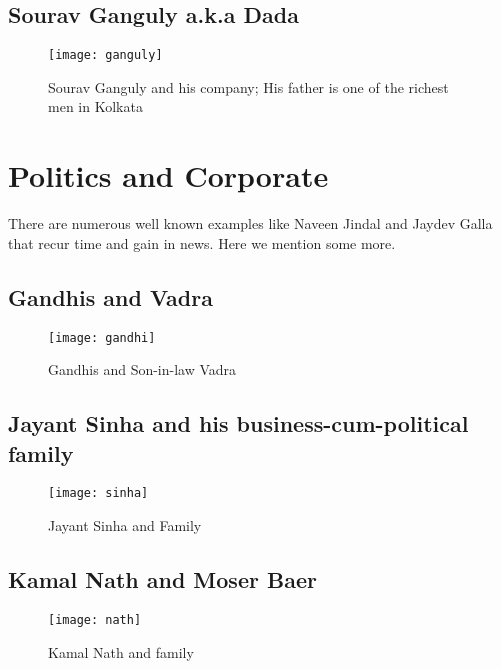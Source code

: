 \subsection{Sourav Ganguly a.k.a Dada}

\begin{figure}[H]
\begin{center}  
\texttt{[image: ganguly]} 
\caption{Sourav Ganguly and his company; His father is one of the richest men in Kolkata}
\label{fig:ganguly}
\end{center}
\end{figure}



\section{Politics and Corporate}

There are numerous well known examples like Naveen Jindal and Jaydev Galla that recur time and gain in news. Here we mention some more.

\subsection{Gandhis and Vadra}

\begin{figure}[H]
\begin{center}  
\texttt{[image: gandhi]} 
\caption{Gandhis and Son-in-law Vadra}
\label{fig:gandhi}
\end{center}
\end{figure}

\subsection{Jayant Sinha and his business-cum-political family}

\begin{figure}[H]
\begin{center}  
\texttt{[image: sinha]} 
\caption{Jayant Sinha and Family}
\label{fig:sinha}
\end{center}
\end{figure}

\subsection{Kamal Nath and Moser Baer}

\begin{figure}[H]
\begin{center}  
\texttt{[image: nath]} 
\caption{Kamal Nath and family}
\label{fig:nath}
\end{center}
\end{figure}